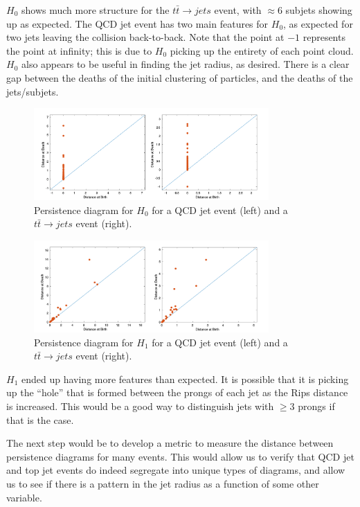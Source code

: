 \documentclass[a4paper,12pt]{report}
\begin{document}
$H_0$ shows much more structure for the $t\bar{t}\rightarrow jets$ event, with $\approx6$ subjets showing up as expected. The QCD jet event has two main features for $H_0$, as expected for two jets leaving the collision back-to-back. Note that the point at $-1$ represents the point at infinity; this is due to $H_0$ picking up the entirety of each point cloud. $H_0$ also appears to be useful in finding the jet radius, as desired. There is a clear gap between the deaths of the initial clustering of particles, and the deaths of the jets/subjets.

\begin{figure}[!htbp]
 \centering
 \includegraphics[width=0.8\textwidth]{H0_both.pdf}
 \caption{\label{fig:H0} Persistence diagram for $H_0$ for a QCD jet event (left) and a $t\bar{t}\rightarrow jets$ event (right). }
\end{figure}

\begin{figure}[!htbp]
 \centering
 \includegraphics[width=0.8\textwidth]{H1_both.pdf}
 \caption{\label{fig:H1} Persistence diagram for $H_1$ for a QCD jet event (left) and a $t\bar{t}\rightarrow jets$ event (right). }
\end{figure}

$H_1$ ended up having more features than expected. It is possible that it is picking up the ``hole'' that is formed between the prongs of each jet as the Rips distance is increased. This would be a good way to distinguish jets with $\geq3$ prongs if that is the case. 

The next step would be to develop a metric to measure the distance between persistence diagrams for many events. This would allow us to verify that QCD jet and top jet events do indeed segregate into unique types of diagrams, and allow us to see if there is a pattern in the jet radius as a function of some other variable. 
\end{document}

